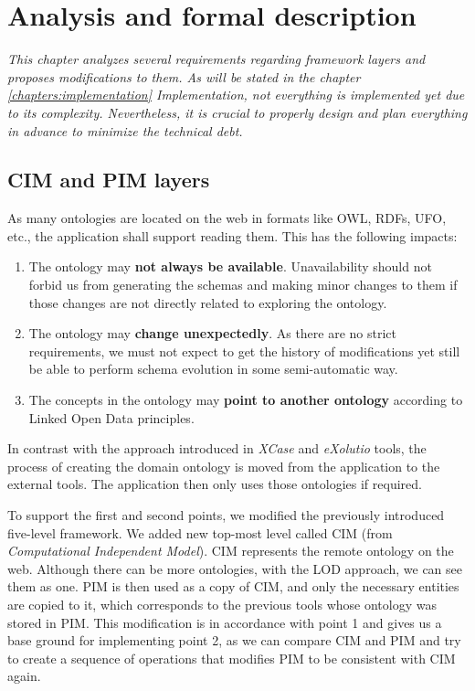 \chapter{Analysis and formal description}
\label{chapters:analysis}

\textit{This chapter analyzes several requirements regarding framework layers and proposes modifications to them. As will be stated in the chapter \ref{chapters:implementation} Implementation, not everything is implemented yet due to its complexity. Nevertheless, it is crucial to properly design and plan everything in advance to minimize the technical debt.}

\section{CIM and PIM layers}

\begin{requirement}
    \label{requirement:ontologies-on-the-web}
    As many ontologies are located on the web in formats like OWL, RDFs, UFO, etc., the application shall support reading them. This has the following impacts:
    \begin{enumerate}
        \item The ontology may \textbf{not always be available}. Unavailability should not forbid us from generating the schemas and making minor changes to them if those changes are not directly related to exploring the ontology.
        \item The ontology may \textbf{change unexpectedly}. As there are no strict requirements, we must not expect to get the history of modifications yet still be able to perform schema evolution in some semi-automatic way.
        \item The concepts in the ontology may \textbf{point to another ontology} according to Linked Open Data principles.
    \end{enumerate}
\end{requirement}

In contrast with the approach introduced in \textit{XCase} and \textit{eXolutio} tools, the process of creating the domain ontology is moved from the application to the external tools. The application then only uses those ontologies if required.

To support the first and second points, we modified the previously introduced five-level framework. We added new top-most level called CIM (from \textit{Computational Independent Model}). CIM represents the remote ontology on the web. Although there can be more ontologies, with the LOD approach, we can see them as one. PIM is then used as a copy of CIM, and only the necessary entities are copied to it, which corresponds to the previous tools whose ontology was stored in PIM. This modification is in accordance with point 1 and gives us a base ground for implementing point 2, as we can compare CIM and PIM and try to create a sequence of operations that modifies PIM to be consistent with CIM again.


